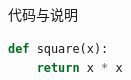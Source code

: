 \begin{frame}[fragile]{代码与说明}
  \begin{lstlisting}[language=Python]
def square(x):
    return x * x
  \end{lstlisting}
\end{frame}
